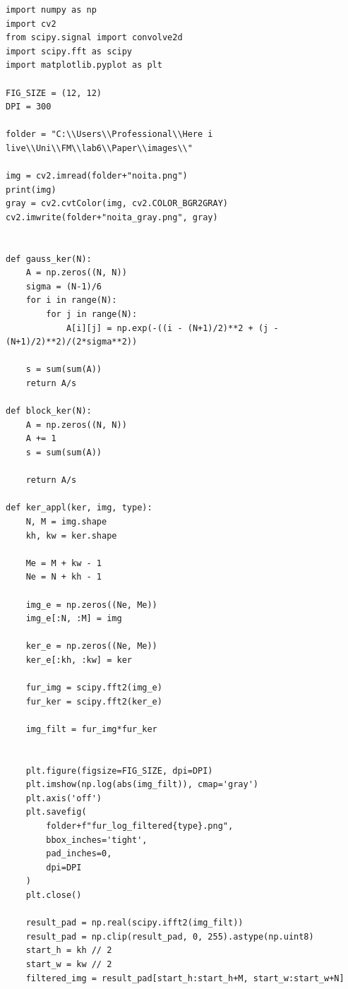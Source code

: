 \documentclass[a4paper, 12pt]{article}
\begin{document}
\begin{lstlisting}[caption={Код для обработки изображения во 2 пункте}]
import numpy as np
import cv2
from scipy.signal import convolve2d
import scipy.fft as scipy
import matplotlib.pyplot as plt

FIG_SIZE = (12, 12)
DPI = 300 

folder = "C:\\Users\\Professional\\Here i live\\Uni\\FM\\lab6\\Paper\\images\\"

img = cv2.imread(folder+"noita.png")
print(img)
gray = cv2.cvtColor(img, cv2.COLOR_BGR2GRAY)
cv2.imwrite(folder+"noita_gray.png", gray)


def gauss_ker(N):
    A = np.zeros((N, N))
    sigma = (N-1)/6
    for i in range(N):
        for j in range(N):
            A[i][j] = np.exp(-((i - (N+1)/2)**2 + (j - (N+1)/2)**2)/(2*sigma**2))

    s = sum(sum(A))
    return A/s

def block_ker(N):
    A = np.zeros((N, N))
    A += 1
    s = sum(sum(A))
    
    return A/s

def ker_appl(ker, img, type):
    N, M = img.shape
    kh, kw = ker.shape

    Me = M + kw - 1
    Ne = N + kh - 1

    img_e = np.zeros((Ne, Me))
    img_e[:N, :M] = img
    
    ker_e = np.zeros((Ne, Me))
    ker_e[:kh, :kw] = ker

    fur_img = scipy.fft2(img_e)
    fur_ker = scipy.fft2(ker_e)

    img_filt = fur_img*fur_ker
    

    plt.figure(figsize=FIG_SIZE, dpi=DPI)
    plt.imshow(np.log(abs(img_filt)), cmap='gray')
    plt.axis('off')
    plt.savefig(
        folder+f"fur_log_filtered{type}.png",
        bbox_inches='tight',
        pad_inches=0,
        dpi=DPI
    )
    plt.close()

    result_pad = np.real(scipy.ifft2(img_filt))
    result_pad = np.clip(result_pad, 0, 255).astype(np.uint8)
    start_h = kh // 2
    start_w = kw // 2
    filtered_img = result_pad[start_h:start_h+M, start_w:start_w+N]


\end{lstlisting}
\end{document}
